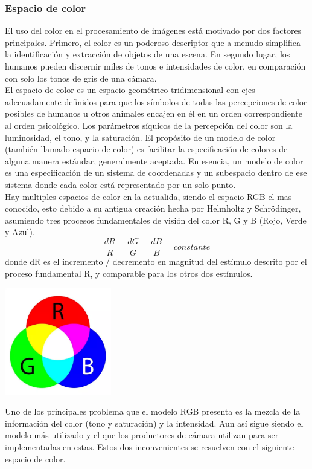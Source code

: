 \subsubsection{Espacio de color}
El uso del color en el procesamiento de imágenes está motivado por dos factores principales. 
Primero, el color es un poderoso descriptor que a menudo simplifica la identificación y 
extracción de objetos de una escena. En segundo lugar, los humanos pueden discernir miles 
de tonos e intensidades de color, en comparación con solo los tonos de gris de una cámara.
\cite{Rafael2002}\\
El espacio de color es un espacio geométrico tridimensional con ejes adecuadamente 
definidos para que los símbolos de todas las percepciones de color posibles de humanos u 
otros animales encajen en él en un orden correspondiente al orden psicológico.
Los parámetros síquicos de la percepción del color son la luminosidad, el tono, y
la saturación. El propósito de un modelo de color (también llamado espacio de color) es 
facilitar la especificación de colores de alguna manera estándar, generalmente aceptada. 
En esencia, un modelo de color es una especificación de un sistema de coordenadas y un 
subespacio dentro de ese sistema donde cada color está representado por un solo punto.\\
Hay multiples espacios de color en la actualida, siendo el espacio RGB el mas conocido, esto
debido a su antigua creación hecha por Helmholtz y Schrödinger, asumiendo 
tres procesos fundamentales de visión del color R, G y B (Rojo, Verde y Azul).
\begin{equation}
    \frac{dR}{R} = \frac{dG}{G} = \frac{dB}{B} = constante
\end{equation}
donde dR es el incremento / decremento en magnitud del estímulo descrito por el proceso 
fundamental R, y comparable para los otros dos estímulos.\cite{Rolf2003}
\begin{center}
    \includegraphics[width=0.35\textwidth]{Capitulo2/Fig10.eps}
    \label{Fig10}
\end{center}
Uno de los principales problema que el modelo RGB presenta es la mezcla de la información
del color (tono y saturación) y la intensidad. Aun así sigue siendo el modelo más utilizado y
el que los productores de cámara utilizan para ser implementadas en estas. Estos dos inconvenientes
se resuelven con el siguiente espacio de color.
